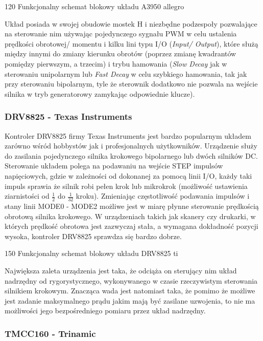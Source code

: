 	{120}
	{Funkcjonalny schemat blokowy układu A3950}
	{allegro}

Układ posiada w swojej obudowie mostek H i niezbędne podzespoły pozwalające na sterowanie nim używając pojedynczego sygnału PWM w celu ustalenia prędkości obrotowej/ momentu i kilku lini typu I/O ({\it Input/ Output}), które służą między innymi do zmiany kierunku obrotów (poprzez zmianę kwadrantów pomiędzy pierwszym, a trzecim) i trybu hamowania ({\it Slow Decay} jak w sterowaniu unipolarnym lub {\it Fast Decay} w celu szybkiego hamowania, tak jak przy sterowaniu bipolarnym, tyle że sterownik dodatkowo nie pozwala na wejście silnika w tryb generatorowy zamykając odpowiednie klucze). 

\subsubsection{DRV8825 - Texas Instruments}

Kontroler DRV8825 firmy Texas Instruments jest bardzo popularnym układem zarówno wśród hobbystów jak i profesjonalnych użytkowników. Urządzenie służy do  zasilania pojedynczego silnika krokowego bipolarnego lub dwóch silników DC. Sterowanie układem polega na podawaniu na wejście STEP impulsów napięciowych, gdzie w zależności od dokonanej za pomocą linii I/O, każdy taki impuls sprawia że silnik robi pełen krok lub mikrokrok (możliwość ustawienia ziarnistości od $ \frac{1}{2} $ do $ \frac{1}{32} $ kroku). Zmieniając częstotliwość podawania impulsów i stany linii MODE0 - MODE2 możliwe jest w miarę płynne sterowanie prędkością obrotową silnika krokowego. W urządzeniach takich jak skanery czy drukarki, w których prędkość obrotowa jest zazwyczaj stała, a wymagana dokładność pozycji wysoka, kontroler DRV8825 sprawdza się bardzo dobrze. 

	{150}
	{Funkcjonalny schemat blokowy układu DRV8825}
	{ti}

Największa zaleta urządzenia jest taka, że odciąża on sterujący nim układ nadrzędny od rygorystycznego, wykonywanego w czasie rzeczywistym sterowania silnikiem krokowym. Znacząca wada jest natomiast taka, że pomimo że możliwe jest zadanie maksymalnego prądu jakim mają być zasilane uzwojenia, to nie ma możliwości jego bezpośredniego pomiaru przez układ nadrzędny.

\subsubsection{TMCC160 - Trinamic}

